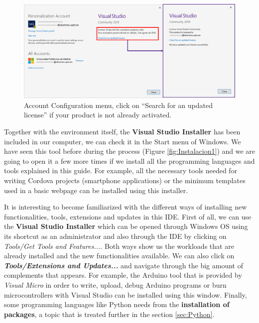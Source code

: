 \begin{figure}
    \centering
    \includegraphics[width= \textwidth]{Figures/Instalacion4}
    \caption{Account Configuration menu, click on ``Search for an updated license'' if your product is not already activated.}
    \label{fig:Instalacion4}
\end{figure}


Together with the environment itself, the \textbf{Visual Studio Installer} has been included in our computer, we can check it in the Start menu of Windows. We have seen this tool before during the process (Figure \ref{fig:Instalacion1}) and we are going to open it a few more times if we install all the programming languages and tools explained in this guide. For example, all the necessary tools needed for writing Cordova projects (smartphone applications) or the minimum templates used in a basic webpage can be installed using this installer.

It is interesting to become familiarized with the different ways of installing new functionalities, tools, extensions and updates in this IDE. First of all, we can use the \textbf{Visual Studio Installer} which can be opened through Windows OS using its shortcut as an administrator and also through the IDE by clicking on \textit{Tools/Get Tools and Features...}. Both ways show us the workloads that are already installed and the new functionalities available. We can also click on \textbf{\textit{Tools/Extensions and Updates...}} and navigate through the big amount of complements that appears. For example, the Arduino tool that is provided by \textit{Visual Micro} in order to write, upload, debug Arduino programs or burn microcontrollers with Visual Studio can be installed using this window. Finally, some programming languages like Python needs from the \textbf{installation of packages}, a topic that is treated further in the section \ref{sec:Python}.


